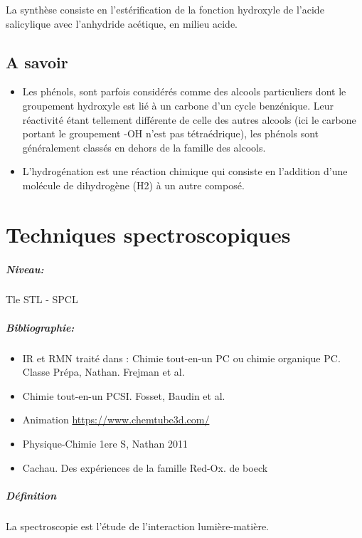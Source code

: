 \documentclass[11pt]{report}
\numberwithin{figure}{section}
\numberwithin{equation}{section}
\numberwithin{table}{section}
\newcommand{\1}{\boldsymbol{1}}
\begin{document}
La synthèse consiste en l'estérification de la fonction hydroxyle de l'acide salicylique avec l'anhydride acétique, en milieu acide.

\section*{A savoir}
\begin{itemize}
\item Les phénols, sont parfois considérés comme des alcools particuliers dont le groupement hydroxyle est lié à un carbone d’un cycle benzénique. Leur réactivité étant tellement différente de celle des autres alcools (ici le carbone portant le groupement -OH n'est pas tétraédrique), les phénols sont généralement classés en dehors de la famille des alcools.
\item L'hydrogénation est une réaction chimique qui consiste en l'addition d'une molécule de dihydrogène (H2) à un autre composé.
\end{itemize}

\chapter{Techniques spectroscopiques}

\paragraph*{Niveau:} Tle STL - SPCL

\paragraph*{Bibliographie:}
\begin{itemize}
\item IR et RMN traité dans : Chimie tout-en-un PC ou chimie organique PC. Classe Prépa, Nathan. Frejman et al.
\item Chimie tout-en-un PCSI. Fosset, Baudin et al.
\item Animation \url{https://www.chemtube3d.com/}
\item Physique-Chimie 1ere S, Nathan 2011
\item Cachau. Des expériences de la famille Red-Ox. de boeck
\end{itemize}

\paragraph{Définition} La spectroscopie est l'étude de l'interaction lumière-matière.
\end{document}
